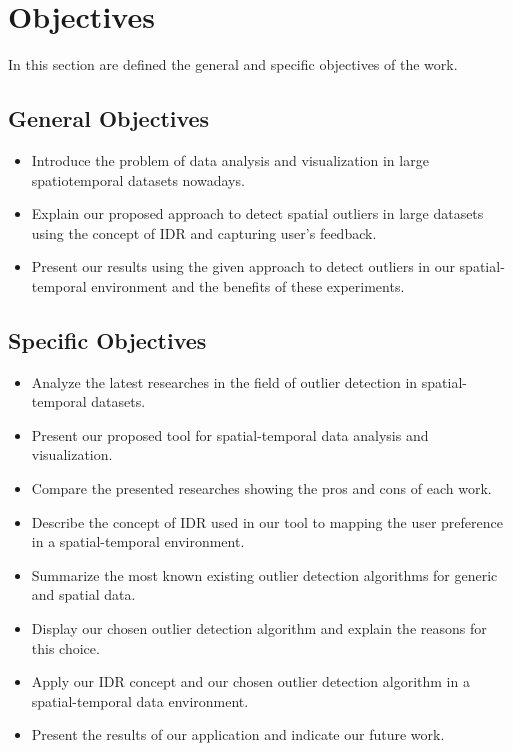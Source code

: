 \section{Objectives}

In this section are defined the general and specific objectives of the work.

\subsection{General Objectives}

\begin{itemize}
	\item
	      Introduce the problem of data analysis and visualization in large spatiotemporal
	      datasets nowadays.
	\item
	      Explain our proposed approach to detect spatial outliers in large datasets using
	      the concept of IDR and capturing user's feedback.
	\item
	      Present our results using the given approach to detect outliers in our spatial-temporal
	      environment and the benefits of these experiments.

\end{itemize}

\subsection{Specific Objectives}

\begin{itemize}
	\item
	      Analyze the latest researches in the field of outlier detection in spatial-temporal
	      datasets.
	\item
	      Present our proposed tool for spatial-temporal data analysis and visualization.
	\item
	      Compare the presented researches showing the pros and cons of each work.
	\item
	      Describe the concept of IDR used in our tool to mapping the user preference in a
	      spatial-temporal environment.
	\item
	      Summarize the most known existing outlier detection algorithms for generic and spatial
	      data.
	\item
	      Display our chosen outlier detection algorithm and explain the reasons for this choice.
	\item
	      Apply our IDR concept and our chosen outlier detection algorithm in a spatial-temporal
	      data environment.
	\item
	      Present the results of our application and indicate our future work.

\end{itemize}

